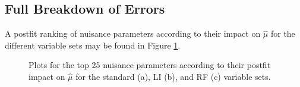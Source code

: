 \subsection{Full Breakdown of Errors}

A postfit ranking of nuisance parameters according to their impact on $\hat{\mu}$ for the different variable sets may be found in Figure \ref{fig:npranking}.

\begin{figure}[!htbp]
  \caption{Plots for the top 25 nuisance parameters according to their postfit impact on $\hat{\mu}$ for the standard (a), LI (b), and RF (c) variable sets.}
  \label{fig:npranking}
\end{figure}


